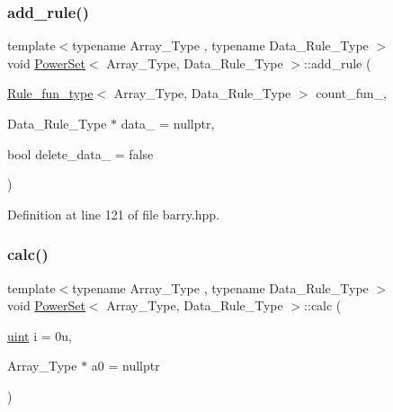 \subsubsection{\texorpdfstring{add\+\_\+rule()}{add\_rule()}\hspace{0.1cm}{\footnotesize\ttfamily [3/3]}}
{\footnotesize\ttfamily template$<$typename Array\+\_\+\+Type , typename Data\+\_\+\+Rule\+\_\+\+Type $>$ \\
void \hyperlink{classbarry_1_1_power_set}{Power\+Set}$<$ Array\+\_\+\+Type, Data\+\_\+\+Rule\+\_\+\+Type $>$\+::add\+\_\+rule (\begin{DoxyParamCaption}\item[{\hyperlink{namespacebarry_aefd7e6d4ba228e2ce1074d075c512178}{Rule\+\_\+fun\+\_\+type}$<$ Array\+\_\+\+Type, Data\+\_\+\+Rule\+\_\+\+Type $>$}]{count\+\_\+fun\+\_\+,  }\item[{Data\+\_\+\+Rule\+\_\+\+Type $\ast$}]{data\+\_\+ = {\ttfamily nullptr},  }\item[{bool}]{delete\+\_\+data\+\_\+ = {\ttfamily false} }\end{DoxyParamCaption})\hspace{0.3cm}{\ttfamily [inline]}}



Definition at line 121 of file barry.\+hpp.

\mbox{\label{classbarry_1_1_power_set_ab15a2b22478e72f351b8ac11392d22c6}} 
\subsubsection{\texorpdfstring{calc()}{calc()}}
{\footnotesize\ttfamily template$<$typename Array\+\_\+\+Type , typename Data\+\_\+\+Rule\+\_\+\+Type $>$ \\
void \hyperlink{classbarry_1_1_power_set}{Power\+Set}$<$ Array\+\_\+\+Type, Data\+\_\+\+Rule\+\_\+\+Type $>$\+::calc (\begin{DoxyParamCaption}\item[{\hyperlink{namespacebarry_a11dfc53ddb4672278319aa04f1e09a6c}{uint}}]{i = {\ttfamily 0u},  }\item[{Array\+\_\+\+Type $\ast$}]{a0 = {\ttfamily nullptr} }\end{DoxyParamCaption})\hspace{0.3cm}{\ttfamily [inline]}}



